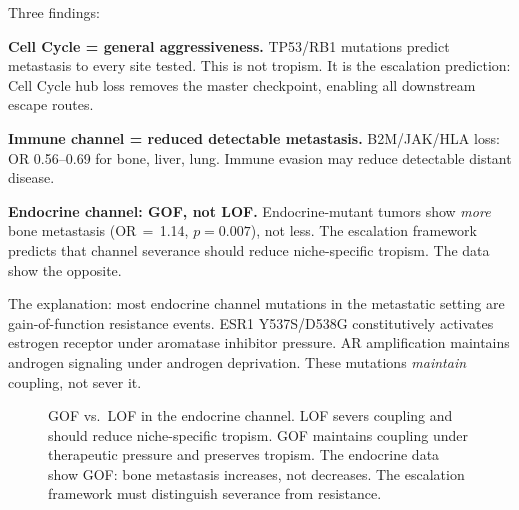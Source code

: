 \documentclass[11pt]{article}
\begin{document}
Three findings:

\textbf{Cell Cycle = general aggressiveness.} TP53/RB1 mutations
predict metastasis to every site tested. This is not tropism. It is
the escalation prediction: Cell Cycle hub loss removes the master
checkpoint, enabling all downstream escape routes.

\textbf{Immune channel = reduced detectable metastasis.}
B2M/JAK/HLA loss: OR 0.56--0.69 for bone, liver, lung. Immune
evasion may reduce detectable distant disease.

\textbf{Endocrine channel: GOF, not LOF.} Endocrine-mutant tumors
show \emph{more} bone metastasis (OR\,$=$\,1.14, $p = 0.007$),
not less. The escalation framework predicts that channel severance
should reduce niche-specific tropism. The data show the opposite.

The explanation: most endocrine channel mutations in the metastatic
setting are gain-of-function resistance events. ESR1 Y537S/D538G
constitutively activates estrogen receptor under aromatase
inhibitor pressure. AR amplification maintains androgen signaling
under androgen deprivation. These mutations \emph{maintain}
coupling, not sever it.

\begin{figure}[ht]
\centering
{}
\caption{GOF vs.\ LOF in the endocrine channel. LOF severs
coupling and should reduce niche-specific tropism. GOF maintains
coupling under therapeutic pressure and preserves tropism. The
endocrine data show GOF: bone metastasis increases, not decreases.
The escalation framework must distinguish severance from resistance.}
\label{fig:gof-lof}
\end{figure}
\end{document}
